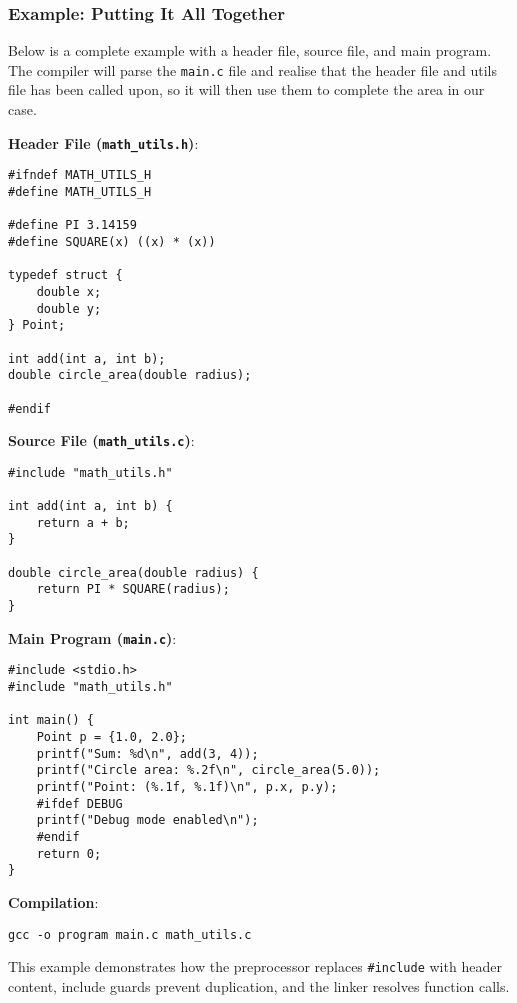 \documentclass[a4paper,12pt]{article}
\begin{document}
\subsubsection*{Example: Putting It All Together}

Below is a complete example with a header file, source file, and main program. The compiler will parse the \verb|main.c| file and realise that the header file and utils file has been called upon, so it will then use them to complete the area in our case. 

\textbf{Header File (\texttt{math\_utils.h})}:
\begin{lstlisting}[caption=Header file construction]
#ifndef MATH_UTILS_H
#define MATH_UTILS_H

#define PI 3.14159
#define SQUARE(x) ((x) * (x))

typedef struct {
    double x;
    double y;
} Point;

int add(int a, int b);
double circle_area(double radius);

#endif
\end{lstlisting}

\textbf{Source File (\texttt{math\_utils.c})}:

\begin{lstlisting}[caption=math\_utils.c file]
#include "math_utils.h"

int add(int a, int b) {
    return a + b;
}

double circle_area(double radius) {
    return PI * SQUARE(radius);
}
\end{lstlisting}

\textbf{Main Program (\texttt{main.c})}:

\begin{lstlisting}[caption=main.c file]
#include <stdio.h>
#include "math_utils.h"

int main() {
    Point p = {1.0, 2.0};
    printf("Sum: %d\n", add(3, 4));
    printf("Circle area: %.2f\n", circle_area(5.0));
    printf("Point: (%.1f, %.1f)\n", p.x, p.y);
    #ifdef DEBUG
    printf("Debug mode enabled\n");
    #endif
    return 0;
}
\end{lstlisting}

\textbf{Compilation}:
\begin{verbatim}
gcc -o program main.c math_utils.c
\end{verbatim}

This example demonstrates how the preprocessor replaces \texttt{\#include} with header content, include guards prevent duplication, and the linker resolves function calls.
\end{document}

